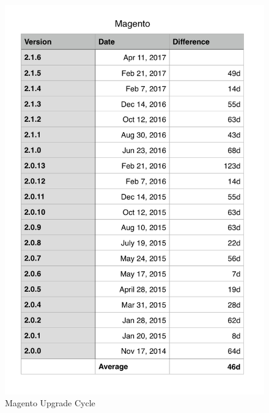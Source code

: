 \begin{figure}
\includegraphics[width=15cm]{images/magentoUpgradeCycle}
\caption{Magento Upgrade Cycle}
\label{attachment:magentoUpgradeCycle}
\end{figure}

\clearpage

